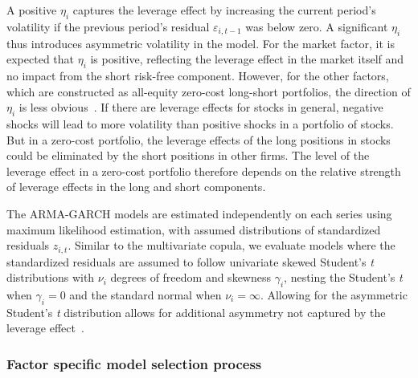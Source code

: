 A positive $\eta_i$ captures the leverage effect by increasing the current period's volatility if the previous period's residual $\varepsilon_{i,t-1}$ was below zero. A significant $\eta_i$ thus introduces asymmetric volatility in the model. For the market factor, it is expected that $\eta_i$ is positive, reflecting the leverage effect in the market itself and no impact from the short risk-free component. However, for the other factors, which are constructed as all-equity zero-cost long-short portfolios, the direction of $\eta_i$ is less obvious~\autocite{ChristoffersenLanglois2013}. If there are leverage effects for stocks in general, negative shocks will lead to more volatility than positive shocks in a portfolio of stocks. But in a zero-cost portfolio, the leverage effects of the long positions in stocks could be eliminated by the short positions in other firms. The level of the leverage effect in a zero-cost portfolio therefore depends on the relative strength of leverage effects in the long and short components.

The ARMA-GARCH models are estimated independently on each series using maximum likelihood estimation, with assumed distributions of standardized residuals $z_{i,t}$. Similar to the multivariate copula, we evaluate models where the standardized residuals are assumed to follow univariate skewed Student's \emph{t} distributions with $\nu_i$ degrees of freedom and skewness $\gamma_i$, nesting the Student's \emph{t} when $\gamma_i = 0$ and the standard normal when $\nu_i = \infty$. Allowing for the asymmetric Student's \emph{t} distribution allows for additional asymmetry not captured by the leverage effect~\autocite{ChristoffersenErrunzaJacobLanglois2012}.

\subsubsection{Factor specific model selection process}

